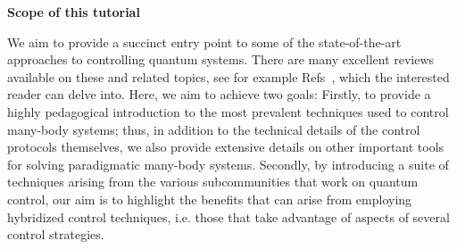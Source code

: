 \begin{center}
{\bf Scope of this tutorial}
\end{center}
We aim to provide a succinct entry point to some of the state-of-the-art approaches to controlling quantum systems. There are many excellent reviews available on these and related topics, see for example Refs~\cite{Deffner2017, Glaser2015, Koch2022, STAreview, Stefanatos2020, PRXQtutorial, GiannelliPLA, Hatomura2024, ansel2024_arxiv, deffner2020thermodynamic}, which the interested reader can delve into. Here, we aim to achieve two goals: Firstly, to provide a highly pedagogical introduction to the most prevalent techniques used to control many-body systems; thus, in addition to the technical details of the control protocols themselves, we also provide extensive details on other important tools for solving paradigmatic many-body systems. Secondly, by introducing a suite of techniques arising from the various subcommunities that work on quantum control, our aim is to highlight the benefits that can arise from employing hybridized control techniques, i.e. those that take advantage of aspects of several control strategies.

